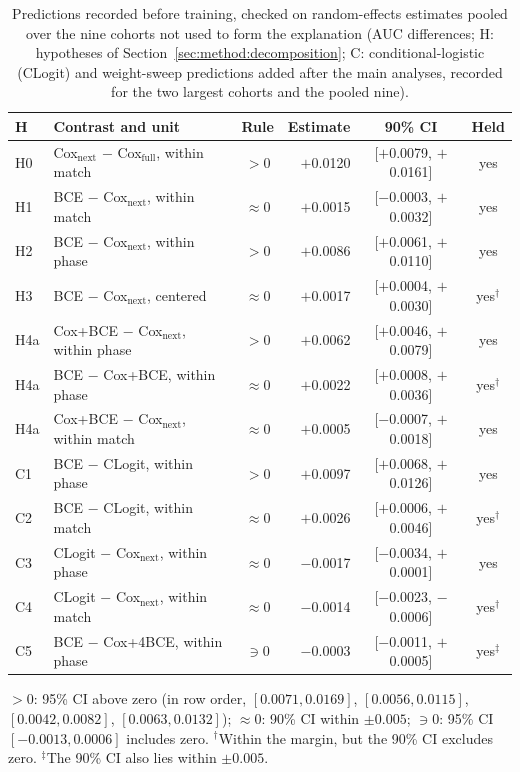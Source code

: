 \begin{table}[b]
\centering\footnotesize
\caption{Predictions recorded before training, checked on random-effects estimates pooled over the nine cohorts not used to form the explanation (AUC differences; H: hypotheses of Section~\ref{sec:method:decomposition}; C: conditional-logistic (CLogit) and weight-sweep predictions added after the main analyses, recorded for the two largest cohorts and the pooled nine).}
\label{tab:predictions}
\setlength{\tabcolsep}{2.1pt}
\begin{tabular}{llcrcc}
\toprule
H & Contrast and unit & Rule & Estimate & 90\% CI & Held \\
\midrule
H0 & Cox$_{\mathrm{next}}$ $-$ Cox$_{\mathrm{full}}$, within match & $>0$ & $+$0.0120 & [$+$0.0079, $+$0.0161] & yes \\
H1 & BCE $-$ Cox$_{\mathrm{next}}$, within match & $\approx0$ & $+$0.0015 & [$-$0.0003, $+$0.0032] & yes \\
H2 & BCE $-$ Cox$_{\mathrm{next}}$, within phase & $>0$ & $+$0.0086 & [$+$0.0061, $+$0.0110] & yes \\
H3 & BCE $-$ Cox$_{\mathrm{next}}$, centered & $\approx0$ & $+$0.0017 & [$+$0.0004, $+$0.0030] & yes$^\dagger$ \\
H4a & Cox+BCE $-$ Cox$_{\mathrm{next}}$, within phase & $>0$ & $+$0.0062 & [$+$0.0046, $+$0.0079] & yes \\
H4a & BCE $-$ Cox+BCE, within phase & $\approx0$ & $+$0.0022 & [$+$0.0008, $+$0.0036] & yes$^\dagger$ \\
H4a & Cox+BCE $-$ Cox$_{\mathrm{next}}$, within match & $\approx0$ & $+$0.0005 & [$-$0.0007, $+$0.0018] & yes \\
\midrule
C1 & BCE $-$ CLogit, within phase & $>0$ & $+$0.0097 & [$+$0.0068, $+$0.0126] & yes \\
C2 & BCE $-$ CLogit, within match & $\approx0$ & $+$0.0026 & [$+$0.0006, $+$0.0046] & yes$^\dagger$ \\
C3 & CLogit $-$ Cox$_{\mathrm{next}}$, within phase & $\approx0$ & $-$0.0017 & [$-$0.0034, $+$0.0001] & yes \\
C4 & CLogit $-$ Cox$_{\mathrm{next}}$, within match & $\approx0$ & $-$0.0014 & [$-$0.0023, $-$0.0006] & yes$^\dagger$ \\
C5 & BCE $-$ Cox+4BCE, within phase & $\ni0$ & $-$0.0003 & [$-$0.0011, $+$0.0005] & yes$^\ddagger$ \\
\bottomrule
\end{tabular}
\smallskip
\parbox{\columnwidth}{\scriptsize $>0$: 95\% CI above zero (in row order, $[0.0071, 0.0169]$, $[0.0056, 0.0115]$, $[0.0042, 0.0082]$, $[0.0063, 0.0132]$); $\approx0$: 90\% CI within $\pm0.005$; $\ni0$: 95\% CI $[-0.0013, 0.0006]$ includes zero. $^\dagger$Within the margin, but the 90\% CI excludes zero. $^\ddagger$The 90\% CI also lies within $\pm0.005$.}
\end{table}

